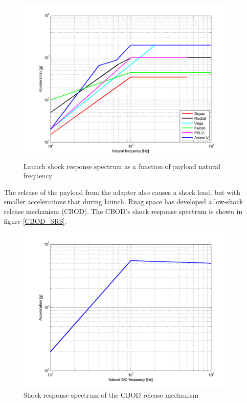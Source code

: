 \begin{figure}
\centering
\includegraphics{img/Shock Loads Acceleration.png}
\caption{Launch shock response spectrum as a function of payload natural frequency}
\label{fig:SRS}
\end{figure}

The release of the payload from the adapter also causes a shock load, but with smaller accelerations that during launch. Ruag space has developed a low-shock release mechanism (CBOD). The CBOD's shock response spectrum is shown in figure \ref{CBOD_SRS}.

\begin{figure}
\centering
\includegraphics{img/CBOD release acceleration.png}
\caption{Shock response spectrum of the CBOD release mechanism}
\label{fig:CBOD_SRS}
\end{figure}


